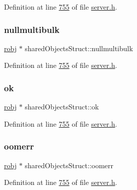 Definition at line \hyperlink{server_8h_source_l00755}{755} of file \hyperlink{server_8h_source}{server.\+h}.

\mbox{\label{structsharedObjectsStruct_afce1de2f20994b933785429dd221b5a3}} 
\subsubsection{\texorpdfstring{nullmultibulk}{nullmultibulk}}
{\footnotesize\ttfamily \hyperlink{structredisObject}{robj} $\ast$ shared\+Objects\+Struct\+::nullmultibulk}



Definition at line \hyperlink{server_8h_source_l00755}{755} of file \hyperlink{server_8h_source}{server.\+h}.

\mbox{\label{structsharedObjectsStruct_a3ca29689f7438a54f3d69614f6874abc}} 
\subsubsection{\texorpdfstring{ok}{ok}}
{\footnotesize\ttfamily \hyperlink{structredisObject}{robj} $\ast$ shared\+Objects\+Struct\+::ok}



Definition at line \hyperlink{server_8h_source_l00755}{755} of file \hyperlink{server_8h_source}{server.\+h}.

\mbox{\label{structsharedObjectsStruct_ae652b93633b3619f9a21e2ebe7afa702}} 
\subsubsection{\texorpdfstring{oomerr}{oomerr}}
{\footnotesize\ttfamily \hyperlink{structredisObject}{robj} $\ast$ shared\+Objects\+Struct\+::oomerr}



Definition at line \hyperlink{server_8h_source_l00755}{755} of file \hyperlink{server_8h_source}{server.\+h}.

